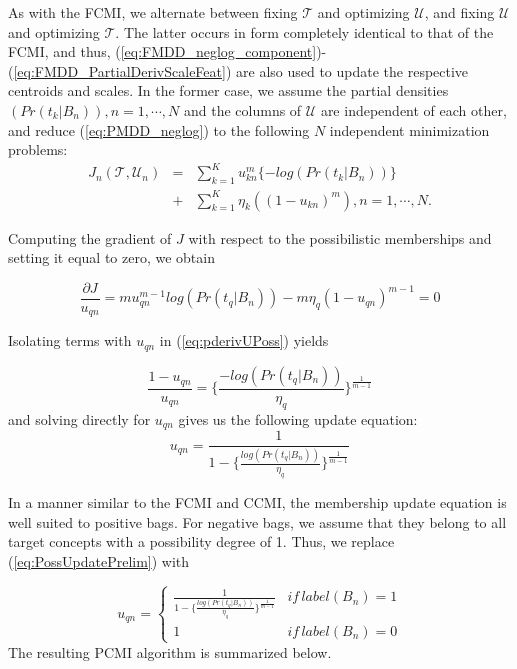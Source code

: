 \documentclass[12pt,dvips]{report}
\numberwithin{equation}{section}
\begin{document}
As with the FCMI, we alternate between fixing $\mathcal{T}$ and optimizing $\mathcal{U}$, and fixing $\mathcal{U}$ and optimizing $\mathcal{T}$.  The latter occurs in form completely identical to that of the FCMI, and thus, (\ref{eq:FMDD_neglog_component})-(\ref{eq:FMDD_PartialDerivScaleFeat}) are also used to update the respective centroids and scales.  In the former case, we assume the partial densities $(Pr(t_{k}\vert B_{n})), n$$=$$1, \cdots, N$ and the columns of $\mathcal{U}$ are independent of each other, and reduce (\ref {eq:PMDD_neglog}) to the following $N$ independent minimization problems:
\begin{eqnarray}  \label{eq:PMDD_neglogRed}
J_n (\mathcal{T}, \mathcal{U}_n)  & = &  \sum_{k=1}^{K} u_{kn}^{m} \{-log(Pr(t_{k}\vert B_{n}))\}  \nonumber \\
                                                                                         &+& \sum_{k=1}^{K} \eta_{k}((1-u_{kn})^{m}), n=1, \cdots, N.
\end{eqnarray} 

Computing the gradient of $J$ with respect to the possibilistic memberships and setting it equal to zero, we obtain

\begin{equation} \label{eq:pderivUPoss}
\frac{\partial J}{u_{qn}}= m u_{qn}^{m-1}log(Pr(t_{q}\vert B_{n})) - m \eta_{q}(1-u_{qn})^{m-1} =0  
\end{equation}

Isolating terms with $u_{qn}$ in (\ref{eq:pderivUPoss}) yields

\begin{equation} \label{eq:pderivUPossV2}
\frac{1-u_{qn}}{u_{qn}}=\{\frac{-log(Pr(t_{q}\vert B_{n}))}{\eta_{q}}\}^\frac{1}{m-1}  
\end{equation}
and solving directly for $u_{qn}$ gives us the following update equation:
\begin{equation} \label{eq:PossUpdatePrelim}
u_{qn}=\frac{1}{1-\{\frac{log(Pr(t_{q}\vert B_{n}))}{\eta_{q}}\}^\frac{1}{m-1}}  
\end{equation}

In a manner similar to the FCMI and CCMI, the membership update equation is well suited to positive bags.  For negative bags, we assume that they belong to all target concepts with a possibility degree of 1.  Thus, we replace (\ref{eq:PossUpdatePrelim}) with

\begin{equation} \label{eq:PossUpdate}
u_{qn}=
\begin{cases} 
\frac{1}{1-\{\frac{log(Pr(t_{q}\vert B_{n}))}{\eta_{q}}\}^\frac{1}{m-1}}	& if \, label(B_{n})\!\!=\!\!1\\
1 & if \, label(B_{n})\!\!=\!\!0
\end{cases}
\end{equation} The resulting PCMI algorithm is summarized below.
\end{document}
